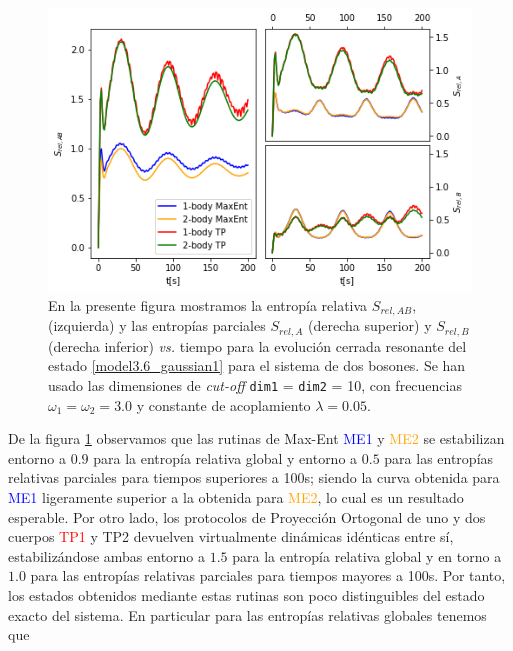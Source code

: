 \documentclass{report} %
\numberwithin{equation}{section}
\begin{document}
\begin{figure}
    \centering
    \includegraphics[scale=0.65]{figs/section3_4/section5_bxb-closed-res/rel_entropy_closed_res_g.jpg}
    \caption{En la presente figura mostramos la entropía relativa $S_{rel,AB}$, (izquierda) y las entropías parciales $S_{rel,A}$ (derecha superior) y $S_{rel,B}$ (derecha inferior) \textit{vs.} tiempo para la evolución cerrada resonante del estado \eqref{model3.6_gaussian1} para el sistema de dos bosones. Se han usado las dimensiones de \textit{cut-off} \texttt{dim1} = \texttt{dim2} = 10, con frecuencias $\omega_1 = \omega_2 = 3.0$ y constante de acoplamiento $\lambda = 0.05$.}
    \label{rel_entropy_closed_res}
\end{figure}

De la figura \ref{rel_entropy_closed_res} observamos que las rutinas de Max-Ent \textcolor{blue}{ME1} y \textcolor{orange}{ME2} se estabilizan entorno a $0.9$ para la entropía relativa global y entorno a $0.5$ para las entropías relativas parciales para tiempos superiores a 100s; siendo la curva obtenida para \textcolor{blue}{ME1} ligeramente superior a la obtenida para \textcolor{orange}{ME2}, lo cual es un resultado esperable. Por otro lado, los protocolos de Proyección Ortogonal de uno y dos cuerpos  \textcolor{red}{TP1} y \textcolor{dark green}{TP2} devuelven virtualmente dinámicas idénticas entre sí, estabilizándose ambas entorno a $1.5$ para la entropía relativa global y en torno a $1.0$ para las entropías relativas parciales para tiempos mayores a 100s. 
Por tanto, los estados obtenidos mediante estas rutinas son poco distinguibles del estado exacto del sistema. En particular para las entropías relativas globales tenemos que 

\end{document}
